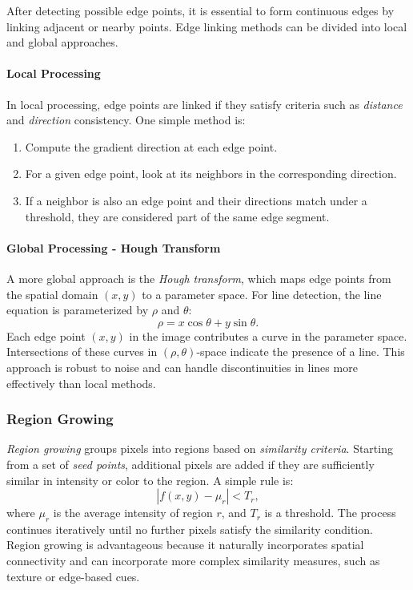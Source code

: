\documentclass[a4paper,12pt]{article}
\begin{document}
After detecting possible edge points, it is essential to form continuous edges by linking adjacent or nearby points. Edge linking methods can be divided into local and global approaches.

\paragraph{Local Processing}

In local processing, edge points are linked if they satisfy criteria such as \emph{distance} and \emph{direction} consistency. One simple method is:
\begin{enumerate}
    \item Compute the gradient direction at each edge point.
    \item For a given edge point, look at its neighbors in the corresponding direction.
    \item If a neighbor is also an edge point and their directions match under a threshold, they are considered part of the same edge segment.
\end{enumerate}

\paragraph{Global Processing - Hough Transform}

A more global approach is the \emph{Hough transform}, which maps edge points from the spatial domain \((x, y)\) to a parameter space. For line detection, the line equation is parameterized by \(\rho\) and \(\theta\):
\begin{equation}
    \rho = x \cos\theta + y \sin\theta.
\end{equation}
Each edge point \((x, y)\) in the image contributes a curve in the parameter space. Intersections of these curves in \((\rho, \theta)\)-space indicate the presence of a line. This approach is robust to noise and can handle discontinuities in lines more effectively than local methods.

\subsubsection{Region Growing}

\emph{Region growing} groups pixels into regions based on \emph{similarity criteria}. Starting from a set of \emph{seed points}, additional pixels are added if they are sufficiently similar in intensity or color to the region. A simple rule is:
\begin{equation}
    |f(x, y) - \mu_r| < T_r,
\end{equation}
where \(\mu_r\) is the average intensity of region \(r\), and \(T_r\) is a threshold. The process continues iteratively until no further pixels satisfy the similarity condition. Region growing is advantageous because it naturally incorporates spatial connectivity and can incorporate more complex similarity measures, such as texture or edge-based cues.
\end{document}
